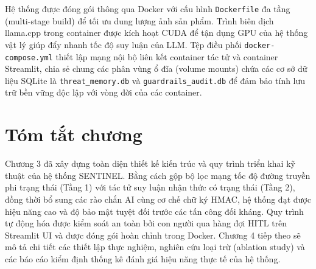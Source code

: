 Hệ thống được đóng gói thông qua Docker với cấu hình \texttt{Dockerfile} đa tầng (multi-stage build) để tối ưu dung lượng ảnh sản phẩm. Trình biên dịch llama.cpp trong container được kích hoạt CUDA để tận dụng GPU của hệ thống vật lý giúp đẩy nhanh tốc độ suy luận của LLM. Tệp điều phối \texttt{docker-compose.yml} thiết lập mạng nội bộ liên kết container tác tử và container Streamlit, chia sẻ chung các phân vùng ổ đĩa (volume mounts) chứa các cơ sở dữ liệu SQLite là \texttt{threat\_memory.db} và \texttt{guardrails\_audit.db} để đảm bảo tính lưu trữ bền vững độc lập với vòng đời của các container.

\section{Tóm tắt chương}

Chương 3 đã xây dựng toàn diện thiết kế kiến trúc và quy trình triển khai kỹ thuật của hệ thống SENTINEL. Bằng cách gộp bộ lọc mạng tốc độ đường truyền phi trạng thái (Tầng 1) với tác tử suy luận nhận thức có trạng thái (Tầng 2), đồng thời bổ sung các rào chắn AI cùng cơ chế chữ ký HMAC, hệ thống đạt được hiệu năng cao và độ bảo mật tuyệt đối trước các tấn công đối kháng. Quy trình tự động hóa được kiểm soát an toàn bởi con người qua hàng đợi HITL trên Streamlit UI và được đóng gói hoàn chỉnh trong Docker. Chương 4 tiếp theo sẽ mô tả chi tiết các thiết lập thực nghiệm, nghiên cứu loại trừ (ablation study) và các báo cáo kiểm định thống kê đánh giá hiệu năng thực tế của hệ thống.

